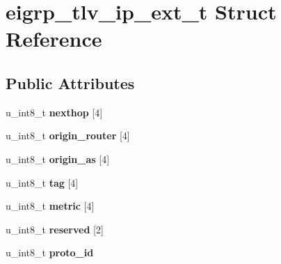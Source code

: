 \hypertarget{structeigrp__tlv__ip__ext__t}{
\section{eigrp\_\-tlv\_\-ip\_\-ext\_\-t Struct Reference}
\label{structeigrp__tlv__ip__ext__t}
}
\subsection*{Public Attributes}
\begin{DoxyCompactItemize}
\item 
\hypertarget{structeigrp__tlv__ip__ext__t_a3890334b1e5685ae10a3470861727848}{
u\_\-int8\_\-t {\bfseries nexthop} \mbox{[}4\mbox{]}}
\label{structeigrp__tlv__ip__ext__t_a3890334b1e5685ae10a3470861727848}

\item 
\hypertarget{structeigrp__tlv__ip__ext__t_a76dc1803f4e5dec99cf81fe430249bc8}{
u\_\-int8\_\-t {\bfseries origin\_\-router} \mbox{[}4\mbox{]}}
\label{structeigrp__tlv__ip__ext__t_a76dc1803f4e5dec99cf81fe430249bc8}

\item 
\hypertarget{structeigrp__tlv__ip__ext__t_aa66cd6b1cff4dc5b29c215d95444f7d9}{
u\_\-int8\_\-t {\bfseries origin\_\-as} \mbox{[}4\mbox{]}}
\label{structeigrp__tlv__ip__ext__t_aa66cd6b1cff4dc5b29c215d95444f7d9}

\item 
\hypertarget{structeigrp__tlv__ip__ext__t_a200672aecf5e7e92cf4a9987e2e88432}{
u\_\-int8\_\-t {\bfseries tag} \mbox{[}4\mbox{]}}
\label{structeigrp__tlv__ip__ext__t_a200672aecf5e7e92cf4a9987e2e88432}

\item 
\hypertarget{structeigrp__tlv__ip__ext__t_ae2695d73d7dd888a1eef1b29ac792f4e}{
u\_\-int8\_\-t {\bfseries metric} \mbox{[}4\mbox{]}}
\label{structeigrp__tlv__ip__ext__t_ae2695d73d7dd888a1eef1b29ac792f4e}

\item 
\hypertarget{structeigrp__tlv__ip__ext__t_ae41a28423aa5ef2b8085c0f4f86329cd}{
u\_\-int8\_\-t {\bfseries reserved} \mbox{[}2\mbox{]}}
\label{structeigrp__tlv__ip__ext__t_ae41a28423aa5ef2b8085c0f4f86329cd}

\item 
\hypertarget{structeigrp__tlv__ip__ext__t_a89dc9db43f772166c5526d8f72218ebf}{
u\_\-int8\_\-t {\bfseries proto\_\-id}}
\label{structeigrp__tlv__ip__ext__t_a89dc9db43f772166c5526d8f72218ebf}


\end{DoxyCompactItemize}
